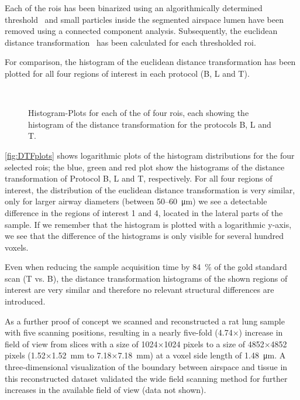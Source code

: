 Each of the \acp{roi} has been binarized using an algorithmically determined threshold~\cite{Otsu1979} and small particles inside the segmented airspace lumen have been removed using a connected component analysis. Subsequently, the euclidean distance transformation~\cite{Danielsson1980} has been calculated for each thresholded \ac{roi}.

For comparison, the histogram of the euclidean distance transformation has been plotted for all four regions of interest in each protocol (B, L and T).

\renewcommand{\imsize}{0.705\linewidth}%
\begin{figure}
	\noindent\makebox[\textwidth]{%
		\subfloat{}%
		\subfloat{}%
	}%
	\\%
	\noindent\makebox[\textwidth]{%
		\subfloat{}%
		\subfloat{}%
	}%
	\caption[Histogram-Plots]{Histogram-Plots for each of the of four \acp{roi}, each showing the histogram of the distance transformation for the protocols B, L and T.}%
	\label{fig:DTFplots}
\end{figure}

\autoref{fig:DTFplots} shows logarithmic plots of the histogram distributions for the four selected \acp{roi}; the blue, green and red plot show the histograms of the distance transformation of Protocol B, L and T, respectively. For all four regions of interest, the distribution of the euclidean distance transformation is very similar, only for larger airway diameters (between 50--\SI{60}{\micro\meter}) we see a detectable difference in the regions of interest 1 and 4, located in the lateral parts of the sample. If we remember that the histogram is plotted with a logarithmic y-axis, we see that the difference of the histograms is only visible for several hundred voxels.

Even when reducing the sample acquisition time by \SI{84}{\percent} of the gold standard scan (T vs. B), the distance transformation histograms of the shown regions of interest are very similar and therefore no relevant structural differences are introduced.

As a further proof of concept we scanned and reconstructed a rat lung sample with five scanning positions, resulting in a nearly five-fold (4.74$\times$) increase in field of view from slices with a size of 1024$\times$1024 pixels to a size of 4852$\times$4852 pixels (1.52$\times$\SI{1.52}{\milli\meter} to 7.18$\times$\SI{7.18}{\milli\meter}) at a voxel side length of \SI{1.48}{\micro\meter}. A three-dimensional visualization of the boundary between airspace and tissue in this reconstructed dataset validated the wide field scanning method for further increases in the available field of view (data not shown).

